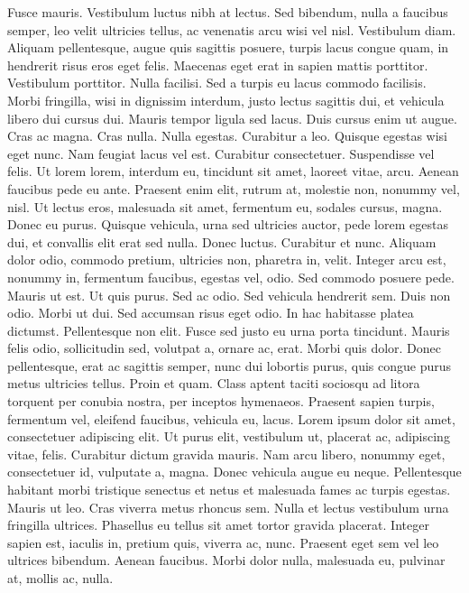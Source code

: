 \documentclass[draft,12pt,twoside,a4paper]{book}
\begin{document}
Fusce mauris.
Vestibulum luctus nibh at lectus.
Sed bibendum, nulla a faucibus semper, leo velit ultricies tellus,
 ac venenatis arcu wisi vel nisl.
Vestibulum diam.
Aliquam pellentesque, augue quis sagittis posuere, turpis lacus congue quam,
 in hendrerit risus eros eget felis.
Maecenas eget erat in sapien mattis porttitor.
Vestibulum porttitor.
Nulla facilisi.
Sed a turpis eu lacus commodo facilisis.
Morbi fringilla, wisi in dignissim interdum, justo lectus sagittis dui,
 et vehicula libero dui cursus dui.
Mauris tempor ligula sed lacus.
Duis cursus enim ut augue.
Cras ac magna.
Cras nulla.
Nulla egestas.
Curabitur a leo.
Quisque egestas wisi eget nunc.
Nam feugiat lacus vel est.
Curabitur consectetuer.
Suspendisse vel felis.
Ut lorem lorem, interdum eu, tincidunt sit amet, laoreet vitae, arcu.
Aenean faucibus pede eu ante.
Praesent enim elit, rutrum at, molestie non, nonummy vel, nisl.
Ut lectus eros, malesuada sit amet, fermentum eu, sodales cursus, magna.
Donec eu purus.
Quisque vehicula, urna sed ultricies auctor, pede lorem egestas dui,
 et convallis elit erat sed nulla.
Donec luctus.
Curabitur et nunc.
Aliquam dolor odio, commodo pretium, ultricies non, pharetra in, velit.
Integer arcu est, nonummy in, fermentum faucibus, egestas vel, odio.
Sed commodo posuere pede.
Mauris ut est.
Ut quis purus.
Sed ac odio.
Sed vehicula hendrerit sem.
Duis non odio.
Morbi ut dui.
Sed accumsan risus eget odio.
In hac habitasse platea dictumst.
Pellentesque non elit.
Fusce sed justo eu urna porta tincidunt.
Mauris felis odio, sollicitudin sed, volutpat a, ornare ac, erat.
Morbi quis dolor.
Donec pellentesque, erat ac sagittis semper, nunc dui lobortis purus,
 quis congue purus metus ultricies tellus.
Proin et quam.
Class aptent taciti sociosqu ad litora torquent per conubia nostra,
 per inceptos hymenaeos.
Praesent sapien turpis, fermentum vel, eleifend faucibus, vehicula eu, lacus.
Lorem ipsum dolor sit amet, consectetuer adipiscing elit.
Ut purus elit, vestibulum ut, placerat ac, adipiscing vitae, felis.
Curabitur dictum gravida mauris.
Nam arcu libero, nonummy eget, consectetuer id, vulputate a, magna.
Donec vehicula augue eu neque.
Pellentesque habitant morbi tristique senectus et netus et malesuada
 fames ac turpis egestas.
Mauris ut leo.
Cras viverra metus rhoncus sem.
Nulla et lectus vestibulum urna fringilla ultrices.
Phasellus eu tellus sit amet tortor gravida placerat.
Integer sapien est, iaculis in, pretium quis, viverra ac, nunc.
Praesent eget sem vel leo ultrices bibendum.
Aenean faucibus.
Morbi dolor nulla, malesuada eu, pulvinar at, mollis ac, nulla.
\end{document}
